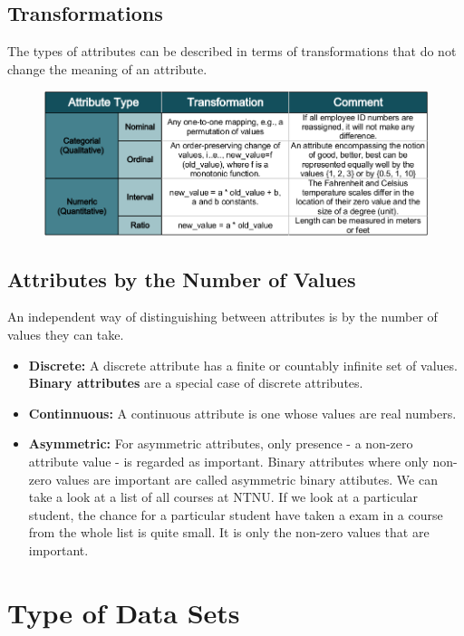 	\clearpage
	\subsection*{Transformations}

		The types of attributes can be described in terms of transformations that
		do not change the meaning of an attribute. 

		\begin{figure}[H]
			\includegraphics[width=\textwidth]{pics/transformations.png}
		\end{figure}

	\subsection*{Attributes by the Number of Values}

	An independent way of distinguishing between attributes is by the number of values
	they can take.

	\begin{itemize}
		\item {\bf Discrete:} A discrete attribute has a finite or countably infinite
		set of values. {\bf Binary attributes} are a special case of discrete attributes. 
		\item {\bf Continnuous:} A continuous attribute is one whose values are real numbers.
		\item {\bf Asymmetric:} For asymmetric attributes, only presence - a non-zero attribute
		value - is regarded as important. Binary attributes where only non-zero values are 
		important are called asymmetric binary attibutes. We can take a look at a list of all 
		courses at NTNU. If we look at a particular student, the chance for a particular student
		have taken a exam in a course from the whole list is quite small. It is only the non-zero
		values that are important. 
	\end{itemize}

	\clearpage
	\section{Type of Data Sets}


